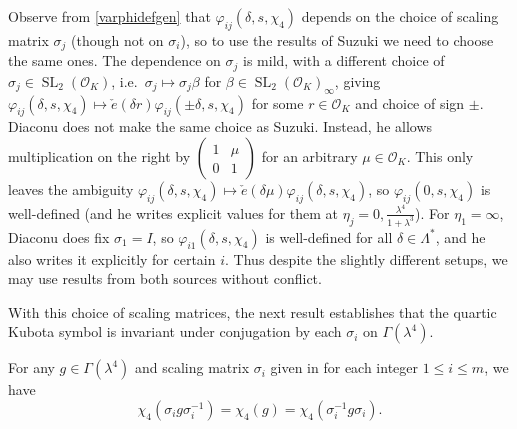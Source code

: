 \documentclass[12pt,reqno]{amsart}
\numberwithin{equation}{section}
\DeclareMathOperator{\SL}{SL}
\begin{document}
\begin{remark}
    Observe from \eqref{varphidefgen} that $\varphi_{ij}(\delta, s, \chi_4)$ depends on the choice of scaling matrix $\sigma_j$ (though not on $\sigma_i$), so to use the results of Suzuki \cite{Suz1} we need to choose the same ones. The dependence on $\sigma_j$ is mild, with a different choice of $\sigma_j \in \SL_2(\mathcal{O}_K)$, i.e.\ $\sigma_j \mapsto \sigma_j \beta$ for $\beta \in \SL_2(\mathcal{O}_K)_\infty$, giving $\varphi_{ij}(\delta, s, \chi_4) \mapsto \check{e}(\delta r)\varphi_{ij}(\pm \delta, s, \chi_4)$ for some $r \in \mathcal{O}_K$ and choice of sign $\pm$. Diaconu \cite{Dia} does not make the same choice as Suzuki. Instead, he allows multiplication on the right by $\left(\begin{smallmatrix}
    1 & \mu \\ 0 & 1
    \end{smallmatrix}\right)$ for an arbitrary $\mu \in \mathcal{O}_K$. This only leaves the ambiguity $\varphi_{ij}(\delta, s, \chi_4) \mapsto \check{e}(\delta \mu)\varphi_{ij}(\delta, s, \chi_4)$, so $\varphi_{ij}(0, s, \chi_4)$ is well-defined (and he writes explicit values for them at $\eta_j = 0, \frac{\lambda^4}{1+\lambda^3}$). For $\eta_1 = \infty$, Diaconu does fix $\sigma_1 = I$, so $\varphi_{i1}(\delta, s, \chi_4)$ is well-defined for all $\delta\in \Lambda^*$, and he also writes it explicitly for certain $i$. Thus despite the slightly different setups, we may use results from both sources \cite{Dia, Suz1} without conflict.
\end{remark}

With this choice of scaling matrices, the next result establishes that
the quartic Kubota symbol is invariant under conjugation by each $\sigma_i$ on $\Gamma(\lambda^4)$.

\begin{lemma}\label{chi4_conjugation_lemma}
    For any $g \in \Gamma(\lambda^4)$ and scaling matrix $\sigma_i$ given in \cite[Table 1]{Suz1} for each integer $1 \leq i \leq m$, we have
    \begin{equation} \label{chi4prop}
        \chi_4(\sigma_i g \sigma_i^{-1}) = \chi_4(g) = \chi_4(\sigma_i^{-1} g \sigma_i).
    \end{equation}
\end{lemma}
\end{document}
